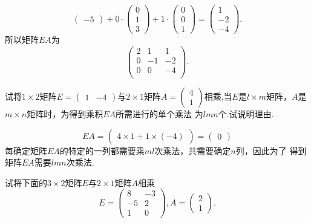 ﻿\documentclass{book} \usepackage{exsheets} \usepackage{xeCJK}
\begin{document}
\begin{solution}
$$\begin{pmatrix}
  -5
\end{pmatrix}+0\cdot
\begin{pmatrix}
  0\\
  1\\
  3
\end{pmatrix}+1\cdot
\begin{pmatrix}
  0\\
  0\\
  1
\end{pmatrix}=
\begin{pmatrix}
  1\\
  -2\\
  -4
\end{pmatrix}.
$$
所以矩阵$EA$为
$$
\begin{pmatrix}
  2 &1  &1 \\
  0 &-1 &-2\\
  0 &0  &-4\\
\end{pmatrix}.
$$
\end{solution}
\begin{question}
  试将$1\times 2$矩阵$E=
  \begin{pmatrix}
    1&-4
  \end{pmatrix}
  $与$2\times 1$矩阵$A=
  \begin{pmatrix}
    4\\
    1
  \end{pmatrix}
  $相乘,当$E$是$l\times
  m$矩阵，$A$是$m\times n$矩阵时，为得到乘积$EA$所需进行的单个乘法
  为$lmn$个.试说明理由.
\end{question}
\begin{solution}
$$
EA=
\begin{pmatrix}
  4\times 1+1\times(-4)
\end{pmatrix}=
\begin{pmatrix}
  0
\end{pmatrix}
$$
每确定矩阵$EA$的特定的一列都需要乘$ml$次乘法，共需要确定$n$列，因此为了
得到矩阵$EA$需要$lmn$次乘法.
\end{solution}
\begin{question}
  试将下面的$3\times 2$矩阵$E$与$2\times 1$矩阵$A$相乘
$$
E=
\begin{pmatrix}
  8&-3\\
  -5&2\\
  1&0
\end{pmatrix},A=
\begin{pmatrix}
  2\\
  1
\end{pmatrix}.
$$
\end{question}
\end{document}
